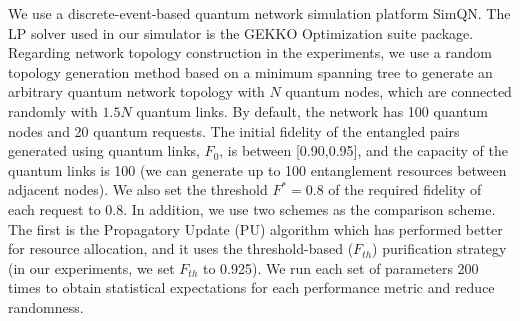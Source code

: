 
We use a discrete-event-based quantum network simulation platform SimQN. The LP solver used in our simulator is the GEKKO Optimization suite package. Regarding network topology construction in the experiments, we use a random topology generation method based on a minimum spanning tree to generate an arbitrary quantum network topology with $N$ quantum nodes, which are connected randomly with $1.5N$ quantum links. By default, the network has 100 quantum nodes and 20 quantum requests. The initial fidelity of the entangled pairs generated using quantum links, $F_0$, is between [0.90,0.95], and the capacity of the quantum links is 100 (we can generate up to 100 entanglement resources between adjacent nodes). We also set the threshold $F^{*} = 0.8$ of the required fidelity of each request to 0.8. In addition, we use two schemes as the comparison scheme. The first is the Propagatory Update (PU) algorithm which has performed better for resource allocation, and it uses the threshold-based ($F_{th}$) purification strategy (in our experiments, we set $F_{th}$ to 0.925). We run each set of parameters 200 times to obtain statistical expectations for each performance metric and reduce randomness.
